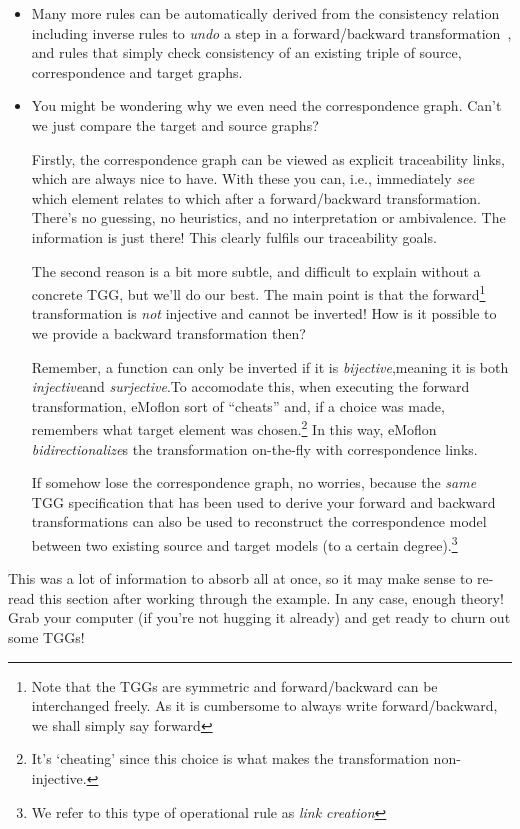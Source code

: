 \begin{itemize}

\item Many more rules can be automatically derived from the consistency relation including inverse rules to \emph{undo} a step in a forward/backward
transformation~\cite{LAVS_ICGT_2012}, and rules that simply check consistency of an existing triple of source, correspondence and target graphs.

\item You might be wondering why we even need the correspondence graph. Can't we just compare the target and source graphs? 

Firstly, the correspondence graph can be viewed as explicit traceability links, which are always nice to have. With these you can, i.e., immediately \emph{see}
which element relates to which after a forward/backward transformation. There's no guessing, no heuristics, and no interpretation or ambivalence. The
information is just there! This clearly fulfils our traceability goals.

The second reason is a bit more subtle, and difficult to explain without a concrete TGG, but we'll do our best. The main point is that the forward\footnote{Note
that the TGGs are symmetric and forward/backward can be interchanged freely.  As it is cumbersome to always write forward/backward, we shall simply say
forward} transformation is \emph{not} injective and cannot be inverted! How is it possible to we provide a backward transformation then?

Remember, a function can only be inverted if it is \emph{bijective},meaning it is both \emph{injective}and
\emph{surjective}.To accomodate this, when executing the forward transformation, eMoflon sort of ``cheats'' and, if a choice was made, 
remembers what target element was chosen.\footnote{It's `cheating' since this choice is what makes the transformation non-injective.} In this way, eMoflon
\emph{bidirectionalize}s the transformation on-the-fly with correspondence links.

If somehow lose the correspondence graph, no worries, because the \emph{same} TGG specification that has been used to derive your forward and backward
transformations can also be used to reconstruct the correspondence model between two existing source and target models (to a certain degree).\footnote{We refer
to this type of operational rule as \emph{link creation}}

\end{itemize}
This was a lot of information to absorb all at once, so it may make sense to re-read this section after working through the example. In any case, enough theory!
Grab your computer (if you're not hugging it already) and get ready to churn out some TGGs!
